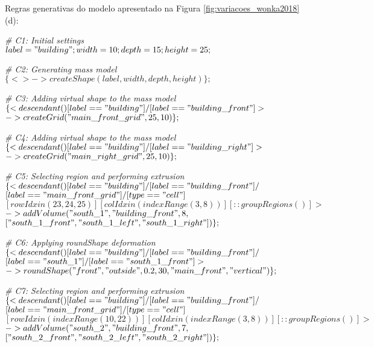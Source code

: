 Regras generativas do modelo apresentado na Figura \ref{fig:variacoes_wonka2018}(d):

\noindent \textit{\# C1: Initial settings}\\
$label = "building"; width = 10; depth = 15; height = 25;$

\noindent \textit{\# C2: Generating mass model}\\
$\{<> -> createShape(label, width, depth, height)\};$

\noindent \textit{\# C3: Adding virtual shape to the mass model}\\
$\{< descendant() [label=="building"] / [label=="building\_front"] > $\\
$-> createGrid("main\_front\_grid", 25, 10)\};$

\noindent \textit{\# C4: Adding virtual shape to the mass model}\\
$\{< descendant() [label=="building"] / [label=="building\_right"] > $\\
$-> createGrid("main\_right\_grid", 25, 10)\};$

\noindent \textit{\# C5: Selecting region and performing extrusion}\\
$\{< descendant() [label=="building"] / [label=="building\_front"] / $\\
$[label=="main\_front\_grid"] / [type=="cell"] $\\
$[rowIdx in (23, 24, 25)] [colIdx in (indexRange(3, 8))] [::groupRegions()] > $\\
$-> addVolume("south\_1", "building\_front", 8, $\\
$["south\_1\_front", "south\_1\_left", "south\_1\_right"])\};$

\noindent \textit{\# C6: Applying roundShape deformation}\\
$\{< descendant() [label=="building"] / [label=="building\_front"] / $\\
$[label=="south\_1"] / [label=="south\_1\_front"] > $\\
$-> roundShape("front", "outside", 0.2, 30, "main\_front", "vertical")\};$

\noindent \textit{\# C7: Selecting region and performing extrusion}\\
$\{< descendant() [label=="building"] / [label=="building\_front"] / $\\
$[label=="main\_front\_grid"] / [type=="cell"] $\\
$[rowIdx in (indexRange(10, 22))] [colIdx in (indexRange(3, 8))] [::groupRegions()] > $\\
$-> addVolume("south\_2", "building\_front", 7, $\\
$["south\_2\_front", "south\_2\_left", "south\_2\_right"])\};$

